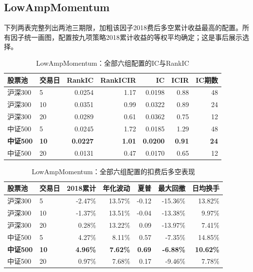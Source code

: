 \subsection{LowAmpMomentum}
下列两表完整列出两池三期限，加粗该因子2018费后多空累计收益最高的配置。所有因子统一画图，配置按九项策略2018累计收益的等权平均确定；这是事后展示选择。
\begin{table}[H]\centering\normalsize\setlength{\tabcolsep}{3.5pt}
\caption{LowAmpMomentum：全部六组配置的IC与RankIC}\begin{tabular}{llrrrrr}\toprule
股票池 & 交易日 & RankIC & RankICIR & IC & ICIR & IC期数\\\midrule
沪深300 & 5 & 0.0254 & 1.17 & 0.0198 & 0.88 & 48 \\
沪深300 & 10 & 0.0351 & 0.99 & 0.0322 & 0.89 & 24 \\
沪深300 & 20 & 0.0289 & 0.61 & 0.0362 & 0.75 & 12 \\
中证500 & 5 & 0.0245 & 1.72 & 0.0185 & 1.29 & 48 \\
\textbf{中证500} & \textbf{10} & \textbf{0.0227} & \textbf{1.01} & \textbf{0.0200} & \textbf{0.91} & \textbf{24} \\
中证500 & 20 & 0.0131 & 0.47 & 0.0170 & 0.65 & 12 \\
\bottomrule\end{tabular}\end{table}
\begin{table}[H]\centering\normalsize\setlength{\tabcolsep}{3.5pt}
\caption{LowAmpMomentum：全部六组配置的扣费后多空表现}\begin{tabular}{llrrrrr}\toprule
股票池 & 交易日 & 2018累计 & 年化波动 & 夏普 & 最大回撤 & 日均换手\\\midrule
沪深300 & 5 & -2.47\% & 13.57\% & -0.12 & -15.36\% & 13.82\% \\
沪深300 & 10 & -1.37\% & 13.51\% & -0.04 & -13.38\% & 9.97\% \\
沪深300 & 20 & 0.28\% & 13.22\% & 0.09 & -13.97\% & 7.41\% \\
中证500 & 5 & 4.27\% & 8.11\% & 0.57 & -7.35\% & 14.85\% \\
\textbf{中证500} & \textbf{10} & \textbf{4.96\%} & \textbf{7.62\%} & \textbf{0.69} & \textbf{-6.88\%} & \textbf{10.62\%} \\
中证500 & 20 & 0.97\% & 7.68\% & 0.17 & -9.46\% & 7.78\% \\
\bottomrule\end{tabular}\end{table}
\clearpage
{}
\clearpage
